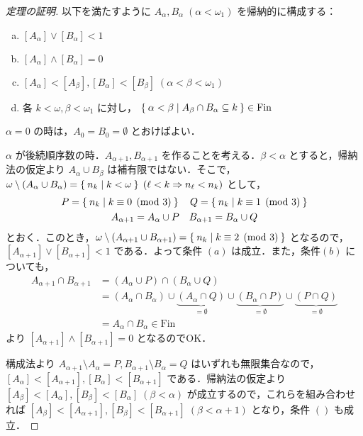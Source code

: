 \documentclass[a4j]{jsarticle}
\newcommand{\Fin}{\mathrm{Fin}}
\begin{document}
\begin{proof}[定理の証明]
 以下を満たすように $A_\alpha, B_\alpha \; (\alpha < \omega_1)$ を帰納的に構成する：
 \begin{enumerate}[(a)]
  \item $[A_\alpha] \vee [B_\alpha] < 1$
	\label{cond:join-coinfinite}
  \item $[A_\alpha] \wedge [B_\alpha] = 0$
	\label{cond:almost-disj}
  \item $[A_\alpha] < [A_\beta], [B_\alpha] < [B_\beta]\;(\alpha < \beta < \omega_1)$
	\label{cond:increasing}
  \item 各 $k < \omega, \beta < \omega_1$ に対し，
	$\Set{\alpha < \beta | A_\beta \cap B_\alpha \subseteq k} \in \Fin$
	\label{cond:finiteness}
 \end{enumerate}

 $\alpha = 0$ の時は，$A_0 = B_0 = \emptyset$ とおけばよい．

 $\alpha$ が後続順序数の時．$A_{\alpha + 1}, B_{\alpha + 1}$ を作ることを考える．$\beta < \alpha$ とすると，帰納法の仮定より $A_\alpha \cup B_\beta$ は補有限ではない．そこで，$\omega \setminus (A_\alpha \cup B_\alpha) = \Set{ n_k | k < \omega } \; (\ell < k \Rightarrow n_\ell < n_k)$ として，
 \begin{gather*}
  P = \Set{n_k | k \equiv 0 \pmod{3}} \quad Q = \Set{n_k | k \equiv 1 \pmod{3}}\\
  A_{\alpha + 1} = A_\alpha \cup P \quad B_{\alpha + 1} = B_\alpha \cup Q
 \end{gather*}
  とおく．このとき，$\omega \setminus (A_{\alpha + 1} \cup B_{\alpha + 1}) = \Set{n_k | k \equiv 2 \pmod{3}}$ となるので，$[A_{\alpha + 1}] \vee [B_{\alpha+1}] < 1$ である．よって条件 $(a)$ は成立．また，条件$(b)$ についても，
 \begin{align*}
  A_{\alpha + 1} \cap B_{\alpha+1} &= (A_\alpha \cup P) \cap (B_\alpha \cup Q)\\
  &= (A_\alpha \cap B_\alpha) \cup \underbrace{ (A_\alpha \cap Q)}_{=\emptyset} \cup \underbrace{(B_\alpha \cap P)}_{=\emptyset} \cup \underbrace{(P \cap Q)}_{=\emptyset}\\
  &= A_\alpha \cap B_\alpha \in \Fin
 \end{align*}
 より $[A_{\alpha+1}] \wedge [B_{\alpha+1}] = 0$ となるのでOK．

 構成法より $A_{\alpha+1} \setminus A_{\alpha} = P,  B_{\alpha+1} \setminus B_\alpha = Q$ はいずれも無限集合なので，$[A_\alpha] < [A_{\alpha+1}], [B_\alpha] < [B_{\alpha+1}]$ である．帰納法の仮定より $[A_\beta] < [A_\alpha], [B_\beta] < [B_\alpha] \; (\beta < \alpha)$ が成立するので，これらを組み合わせれば $[A_\beta] < [A_{\alpha+1}], [B_\beta] < [B_{\alpha+1}] \; (\beta < \alpha+1)$ となり，条件 $()$ も成立．


\end{proof}
\end{document}
